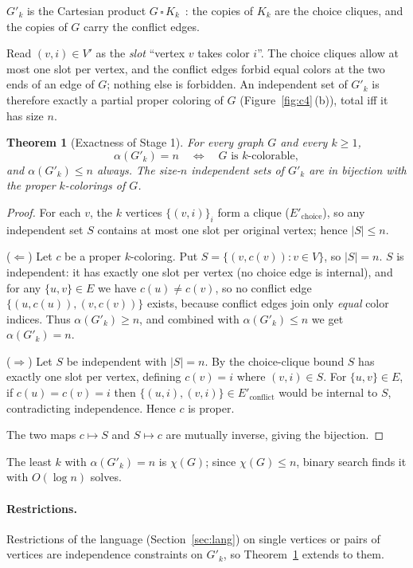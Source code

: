 \documentclass[a4paper,fleqn]{cas-sc}
\newtheorem{theorem}{Theorem}[section]
\newcommand{\indep}{\alpha}
\begin{document}
\noindent $G'_k$ is the Cartesian product $G\,\square\,K_k$~\cite{HammackImrichKlavzar2011}:
the copies of $K_k$ are the choice cliques, and the copies of $G$ carry the conflict
edges.

Read $(v,i)\in V'$ as the \emph{slot} ``vertex $v$ takes color $i$''. The choice
cliques allow at most one slot per vertex, and the conflict edges forbid equal colors
at the two ends of an edge of $G$; nothing else is forbidden. An independent set of
$G'_k$ is therefore exactly a partial proper coloring of $G$
(Figure~\ref{fig:c4}\,(b)), total iff it has size $n$.

\begin{theorem}[Exactness of Stage 1]
\label{thm:col2is}
For every graph $G$ and every $k\ge 1$,
\[
  \indep(G'_k) = n \quad\Longleftrightarrow\quad G \text{ is } k\text{-colorable},
\]
and $\indep(G'_k)\le n$ always. The size-$n$ independent sets of $G'_k$ are in bijection with
the proper $k$-colorings of $G$.
\end{theorem}

\begin{proof}
For each $v$, the $k$ vertices $\{(v,i)\}_i$ form a clique
($E'_{\mathrm{choice}}$), so any independent set $S$ contains at most one slot per
original vertex; hence $|S|\le n$.

($\Leftarrow$) Let $c$ be a proper $k$-coloring. Put
$S=\{(v,c(v)):v\in V\}$, so $|S|=n$. $S$ is independent: it has exactly one slot
per vertex (no choice edge is internal), and for any $\{u,v\}\in E$ we have
$c(u)\ne c(v)$, so no conflict edge $\{(u,c(u)),(v,c(v))\}$ exists, because conflict
edges join only \emph{equal} color indices. Thus $\indep(G'_k)\ge n$, and combined
with $\indep(G'_k)\le n$ we get $\indep(G'_k)=n$.

($\Rightarrow$) Let $S$ be independent with $|S|=n$. By the choice-clique bound $S$
has exactly one slot per vertex, defining $c(v)=i$ where $(v,i)\in S$. For
$\{u,v\}\in E$, if $c(u)=c(v)=i$ then $\{(u,i),(v,i)\}\in E'_{\mathrm{conflict}}$
would be internal to $S$, contradicting independence. Hence $c$ is proper.

The two maps $c\mapsto S$ and $S\mapsto c$ are mutually inverse, giving the
bijection.
\end{proof}

The least $k$ with $\indep(G'_k)=n$ is $\chi(G)$; since $\chi(G)\le n$, binary search
finds it with $O(\log n)$ solves.

\paragraph{Restrictions.} Restrictions of the language (Section~\ref{sec:lang}) on
single vertices or pairs of vertices are independence constraints on $G'_k$, so
Theorem~\ref{thm:col2is} extends to them.
\end{document}

